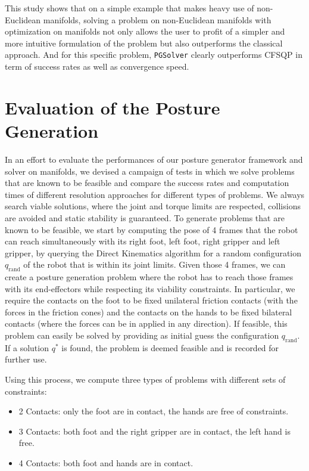 This study shows that on a simple example that makes heavy use of non-Euclidean manifolds, solving a problem on non-Euclidean manifolds with optimization on manifolds not only allows the user to profit of a simpler and more intuitive formulation of the problem but also outperforms the classical approach.
And for this specific problem, {\tt PGSolver} clearly outperforms CFSQP in term of success rates as well as convergence speed.


\section{Evaluation of the Posture Generation}
\label{sec:evaluation_of_the_posture_generation}

In an effort to evaluate the performances of our posture generator framework and solver on manifolds, we devised a campaign of tests in which we solve problems that are known to be feasible and compare the success rates and computation times of different resolution approaches for different types of problems.
We always search viable solutions, where the joint and torque limits are respected, collisions are avoided and static stability is guaranteed.
To generate problems that are known to be feasible, we start by computing the pose of 4 frames that the robot can reach simultaneously with its right foot, left foot, right gripper and left gripper, by querying the Direct Kinematics algorithm for a random configuration $q_\text{rand}$ of the robot that is within its joint limits.
Given those 4 frames, we can create a posture generation problem where the robot has to reach those frames with its end-effectors while respecting its viability constraints.
In particular, we require the contacts on the foot to be fixed unilateral friction contacts (with the forces in the friction cones) and the contacts on the hands to be fixed bilateral contacts (where the forces can be in applied in any direction).
If feasible, this problem can easily be solved by providing as initial guess the configuration $q_\text{rand}$.
If a solution $q^*$ is found, the problem is deemed feasible and is recorded for further use.

Using this process, we compute three types of problems with different sets of constraints:
\begin{itemize}
  \item 2 Contacts: only the foot are in contact, the hands are free of constraints.
  \item 3 Contacts: both foot and the right gripper are in contact, the left hand is free.
  \item 4 Contacts: both foot and hands are in contact.
\end{itemize}

